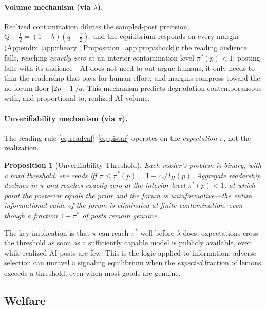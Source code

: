 \documentclass[12pt]{article}
\newtheorem{proposition}{Proposition}
\begin{document}
\paragraph{Volume mechanism (via $\lambda$).} Realized contamination dilutes the sampled-post precision, $Q - \tfrac12 = (1-\lambda)(q-\tfrac12)$, and the equilibrium responds on every margin (Appendix~\ref{app:theory}, Proposition~\ref{app:prop:shock}): the reading audience falls, reaching \emph{exactly zero} at an interior contamination level $\pi^*(p) < 1$; posting falls with its audience---AI does not need to out-argue humans, it only needs to thin the readership that pays for human effort; and margins compress toward the no-forum floor $|2p-1|/a$. This mechanism predicts degradation contemporaneous with, and proportional to, realized AI volume.

\paragraph{Unverifiability mechanism (via $\pi$).} The reading rule \eqref{eq:readval}--\eqref{eq:pistar} operates on the \emph{expectation} $\pi$, not the realization.

\begin{proposition}[Unverifiability Threshold]
\label{prop:threshold}
Each reader's problem is binary, with a hard threshold: she reads iff $\pi \le \pi^*(p) = 1 - c_r/I_H(p)$. Aggregate readership declines in $\pi$ and reaches exactly zero at the interior level $\pi^*(p) < 1$, at which point the posterior equals the prior and the forum is uninformative---the entire informational value of the forum is eliminated at finite contamination, even though a fraction $1 - \pi^*$ of posts remain genuine.
\end{proposition}

The key implication is that $\pi$ can reach $\pi^*$ well before $\lambda$ does: expectations cross the threshold as soon as a sufficiently capable model is publicly available, even while realized AI posts are few. This is the \citet{akerlof1970} logic applied to information: adverse selection can unravel a signaling equilibrium when the \emph{expected} fraction of lemons exceeds a threshold, even when most goods are genuine.

\subsection{Welfare}
\label{sec:welfare}
\end{document}
